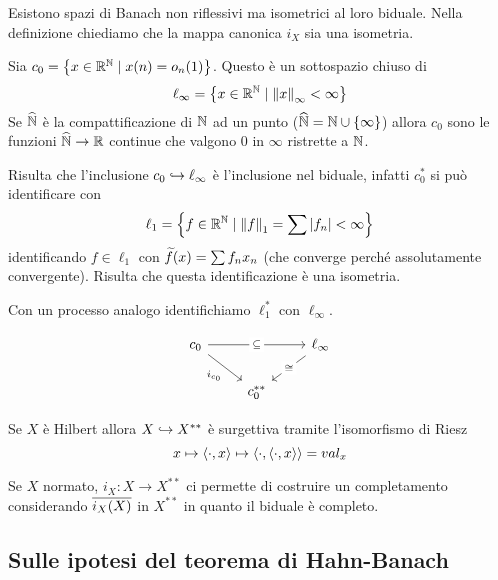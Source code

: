 \begin{remark}
Esistono spazi di Banach non riflessivi ma isometrici al loro biduale. Nella definizione chiediamo che la mappa canonica $i_X$ sia una isometria.
\end{remark}

\begin{example}\label{ExDualel1c0}
Sia $c_0=\left\{{x\in \mathbb{R}^{\mathbb{N}}\mid x(n)=o_n(1)}\right\}$. Questo \`e un sottospazio chiuso di \[\ell_\infty=\left\{{x\in \mathbb{R}^{\mathbb{N}}\mid \left\Vert{x}\right\Vert_\infty< \infty}\right\}\]
Se $\widehat{\mathbb{N}}$ \`e la compattificazione di $\mathbb{N}$ ad un punto ($\widehat{\mathbb{N}}=\mathbb{N}\cup\left\{{\infty}\right\}$) allora $c_0$ sono le funzioni $\widehat{\mathbb{N}}\to \mathbb{R}$ continue che valgono $0$ in $\infty$ ristrette a $\mathbb{N}$.


Risulta che l'inclusione $c_0\hookrightarrow \ell_\infty$ \`e l'inclusione nel biduale, infatti $c_0^\ast$ si pu\`o identificare con
\[\ell_1=\left\{{f\in\mathbb{R}^{\mathbb{N}}\mid \left\Vert{f}\right\Vert_1=\sum\left|{f_n}\right|<\infty}\right\}\]
identificando $f\in \ell_1$ con $\widetilde{f}(x)=\sum f_n x_n$ (che converge perch\'e assolutamente convergente). Risulta che questa identificazione \`e una isometria. 

Con un processo analogo identifichiamo $\ell_1^\ast$ con $\ell_\infty$.

\[\begin{tikzcd}
	{c_0} && {\ell_\infty} \\
	& {c_0^{\ast\ast}}
	\arrow["\subseteq"{description}, from=1-1, to=1-3]
	\arrow["{i_{c_0}}"', from=1-1, to=2-2]
	\arrow["\cong"{description}, from=1-3, to=2-2]
\end{tikzcd}\]
\end{example}

\begin{remark}
Se $X$ \`e Hilbert allora $X\hookrightarrow X^{\ast\ast}$ \`e surgettiva tramite l'isomorfismo di Riesz
\[x\mapsto \left\langle {\cdot,x}\right\rangle\mapsto \left\langle {\cdot,\left\langle {\cdot,x}\right\rangle}\right\rangle=val_x\]
\end{remark}

\begin{remark}
Se $X$ normato, $i_X:X\to X^{\ast\ast}$ ci permette di costruire un completamento considerando $\overline{i_X(X)}$ in $X^{\ast\ast}$ in quanto il biduale \`e completo.
\end{remark}


\subsection{Sulle ipotesi del teorema di Hahn-Banach}

